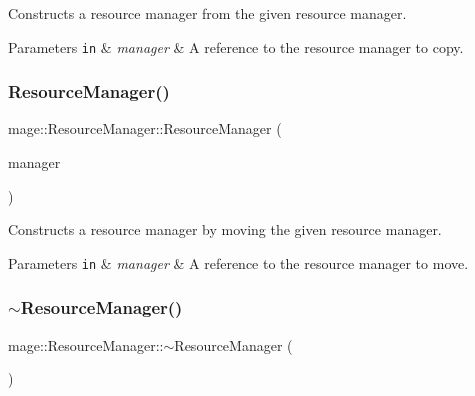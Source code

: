 Constructs a resource manager from the given resource manager.


\begin{DoxyParams}[1]{Parameters}
\mbox{\tt in}  & {\em manager} & A reference to the resource manager to copy. \\
\hline
\end{DoxyParams}
\hypertarget{classmage_1_1_resource_manager_a243bf757dc9f90cfaf57cb9d5f42349f}{}\label{classmage_1_1_resource_manager_a243bf757dc9f90cfaf57cb9d5f42349f} 
\subsubsection{\texorpdfstring{Resource\+Manager()}{ResourceManager()}\hspace{0.1cm}{\footnotesize\ttfamily [3/3]}}
{\footnotesize\ttfamily mage\+::\+Resource\+Manager\+::\+Resource\+Manager (\begin{DoxyParamCaption}\item[{\hyperlink{classmage_1_1_resource_manager}{Resource\+Manager} \&\&}]{manager }\end{DoxyParamCaption})\hspace{0.3cm}{\ttfamily [default]}}

Constructs a resource manager by moving the given resource manager.


\begin{DoxyParams}[1]{Parameters}
\mbox{\tt in}  & {\em manager} & A reference to the resource manager to move. \\
\hline
\end{DoxyParams}
\hypertarget{classmage_1_1_resource_manager_ad4bed85d3656f90072c5d47f50618add}{}\label{classmage_1_1_resource_manager_ad4bed85d3656f90072c5d47f50618add} 
\subsubsection{\texorpdfstring{$\sim$\+Resource\+Manager()}{~ResourceManager()}}
{\footnotesize\ttfamily mage\+::\+Resource\+Manager\+::$\sim$\+Resource\+Manager (\begin{DoxyParamCaption}{ }\end{DoxyParamCaption})\hspace{0.3cm}{\ttfamily [default]}}

